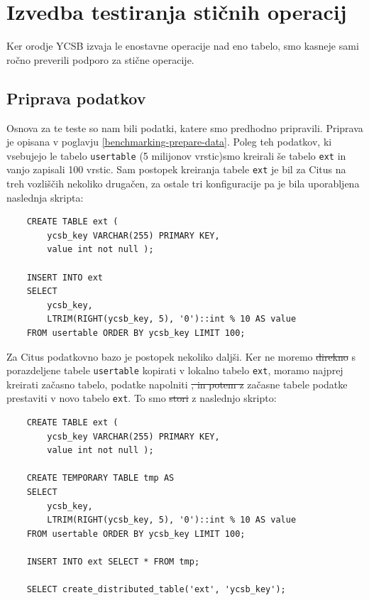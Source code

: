 \documentclass[a4paper, 12pt]{book}
\providecommand{\DIFaddtex}[1]{{\protect\color{blue}\uwave{#1}}} %
\providecommand{\DIFdeltex}[1]{{\protect\color{red}\sout{#1}}}                      %
\providecommand{\DIFaddbegin}{} %
\providecommand{\DIFaddend}{} %
\providecommand{\DIFdelbegin}{} %
\providecommand{\DIFdelend}{} %
\providecommand{\DIFadd}[1]{\texorpdfstring{\DIFaddtex{#1}}{#1}} %
\providecommand{\DIFdel}[1]{\texorpdfstring{\DIFdeltex{#1}}{}} %
\newcommand{\DIFscaledelfig}{0.5}
\newlength{\DIFdelgraphicswidth} %
\newlength{\DIFdelgraphicsheight} %
\newcommand{\DIFaddincludegraphics}[2][]{{\color{blue}\fbox{\DIFOincludegraphics[#1]{#2}}}} %
\newcommand{\DIFdelincludegraphics}[2][]{%
\sbox{\DIFdelgraphicsbox}{\DIFOincludegraphics[#1]{#2}}%
\settoboxwidth{\DIFdelgraphicswidth}{\DIFdelgraphicsbox} %
\settoboxtotalheight{\DIFdelgraphicsheight}{\DIFdelgraphicsbox} %
\scalebox{\DIFscaledelfig}{%
\parbox[b]{\DIFdelgraphicswidth}{\usebox{\DIFdelgraphicsbox}\\[-\baselineskip] \rule{\DIFdelgraphicswidth}{0em}}\llap{\resizebox{\DIFdelgraphicswidth}{\DIFdelgraphicsheight}{%
\setlength{\unitlength}{\DIFdelgraphicswidth}%
\begin{picture}(1,1)%
\thicklines\linethickness{2pt} %
{\color[rgb]{1,0,0}\put(0,0){\framebox(1,1){}}}%
{\color[rgb]{1,0,0}\put(0,0){\line( 1,1){1}}}%
{\color[rgb]{1,0,0}\put(0,1){\line(1,-1){1}}}%
\end{picture}%
}\hspace*{3pt}}} %
} %
\DeclareRobustCommand{\DIFaddbegin}{\DIFOaddbegin \let\includegraphics\DIFaddincludegraphics} %
\DeclareRobustCommand{\DIFaddend}{\DIFOaddend \let\includegraphics\DIFOincludegraphics} %
\DeclareRobustCommand{\DIFdelbegin}{\DIFOdelbegin \let\includegraphics\DIFdelincludegraphics} %
\DeclareRobustCommand{\DIFdelend}{\DIFOaddend \let\includegraphics\DIFOincludegraphics} %
\begin{document}
\newpage
\section{Izvedba testiranja stičnih operacij}
Ker orodje YCSB izvaja le enostavne operacije nad eno tabelo, smo kasneje sami ročno preverili podporo za stične operacije.

\subsection{Priprava podatkov}
Osnova za te teste so nam bili podatki, katere smo predhodno pripravili. Priprava je opisana v poglavju \ref{benchmarking-prepare-data}. Poleg teh podatkov, ki vsebujejo le tabelo \texttt{usertable} (5 milijonov vrstic)\DIFaddbegin \DIFadd{, }\DIFaddend smo kreirali še tabelo \texttt{ext} in vanjo zapisali 100 vrstic. Sam postopek kreiranja tabele \texttt{ext} je bil za Citus na treh vozliščih nekoliko drugačen, za ostale tri konfiguracije pa je bila uporabljena naslednja skripta:

\begin{listing}[H]
\begin{verbatim}
    CREATE TABLE ext (
        ycsb_key VARCHAR(255) PRIMARY KEY,
        value int not null );

    INSERT INTO ext
    SELECT
        ycsb_key,
        LTRIM(RIGHT(ycsb_key, 5), '0')::int % 10 AS value
    FROM usertable ORDER BY ycsb_key LIMIT 100;
\end{verbatim}
\label{benchmarking_joins_data}
\end{listing}

Za Citus podatkovno bazo je postopek nekoliko daljši. Ker ne moremo \DIFdelbegin \DIFdel{direkno }\DIFdelend \DIFaddbegin \DIFadd{neposredno }\DIFaddend s porazdeljene tabele \texttt{usertable} kopirati v lokalno tabelo \texttt{ext}, moramo najprej kreirati začasno tabelo, podatke napolniti \DIFdelbegin \DIFdel{, in potem z }\DIFdelend \DIFaddbegin \DIFadd{in potem iz }\DIFaddend začasne tabele podatke prestaviti v novo tabelo \texttt{ext}. To smo \DIFdelbegin \DIFdel{stori }\DIFdelend \DIFaddbegin \DIFadd{storili }\DIFaddend z naslednjo skripto:

\begin{listing}[H]
\begin{verbatim}
    CREATE TABLE ext (
        ycsb_key VARCHAR(255) PRIMARY KEY,
        value int not null );

    CREATE TEMPORARY TABLE tmp AS
    SELECT
        ycsb_key,
        LTRIM(RIGHT(ycsb_key, 5), '0')::int % 10 AS value
    FROM usertable ORDER BY ycsb_key LIMIT 100;

    INSERT INTO ext SELECT * FROM tmp;

    SELECT create_distributed_table('ext', 'ycsb_key');
\end{verbatim}
\label{benchmarking_joins_citus_data}
\end{listing}
\end{document}
